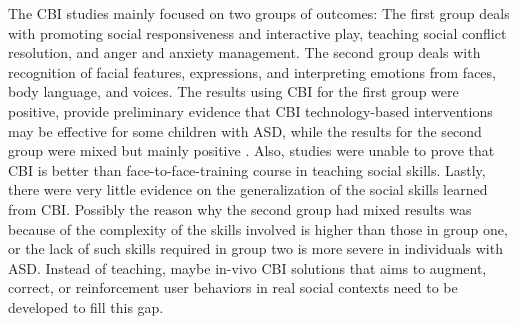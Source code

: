 \documentclass{ut-thesis}
\begin{document}
The CBI studies mainly focused on two groups of outcomes: The first group deals with promoting social responsiveness and interactive play, teaching social conflict resolution, and anger and anxiety management.  The second group deals with recognition of facial features, expressions, and interpreting emotions from faces, body language, and voices.  The results using CBI for the first group were positive, provide preliminary evidence that CBI technology-based interventions may be effective for some children with ASD, while the results for the second group were mixed but mainly positive \cite{ramdoss2012computer}.  Also, studies were unable to prove that CBI is better than face-to-face-training course in teaching social skills.  Lastly, there were very little evidence on the generalization of the social skills learned from CBI.  Possibly the reason why the second group had mixed results was because of the complexity of the skills involved is higher than those in group one, or the lack of such skills required in group two is more severe in individuals with ASD.  Instead of teaching, maybe in-vivo CBI solutions that aims to augment, correct, or reinforcement user behaviors in real social contexts need to be developed to fill this gap.
\end{document}
